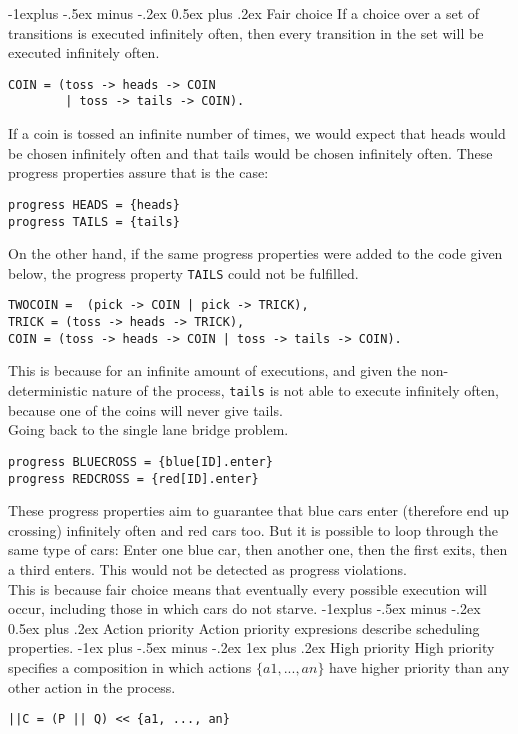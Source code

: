 \documentclass[10pt,landscape]{article}
\makeatletter
\renewcommand{\subsection}{\@startsection{subsection}{2}{0mm}%
                                {-1explus -.5ex minus -.2ex}%
                                {0.5ex plus .2ex}%
                                {\normalfont\normalsize\bfseries}}
\renewcommand{\subsubsection}{\@startsection{subsubsection}{3}{0mm}%
                                {-1ex plus -.5ex minus -.2ex}%
                                {1ex plus .2ex}%
                                {\normalfont\small\bfseries}}
\makeatother
\begin{document}
\begin{multicols}{3}
\subsection{Fair choice}
If a choice over a set of transitions is executed infinitely often, then every transition in the set will be executed infinitely often.
\begin{verbatim}
COIN = (toss -> heads -> COIN
        | toss -> tails -> COIN).
\end{verbatim}
If a coin is tossed an infinite number of times, we would expect that heads would be chosen infinitely often and that tails would be chosen infinitely often. These progress properties assure that is the case:
\begin{verbatim}
progress HEADS = {heads}
progress TAILS = {tails}
\end{verbatim}
On the other hand, if the same progress properties were added to the code given below, the progress property \texttt{TAILS} could not be fulfilled.
\begin{verbatim}
TWOCOIN =  (pick -> COIN | pick -> TRICK),
TRICK = (toss -> heads -> TRICK),
COIN = (toss -> heads -> COIN | toss -> tails -> COIN).
\end{verbatim}
This is because for an infinite amount of executions, and given the non-deterministic nature of the process, \texttt{tails} is not able to execute infinitely often, because one of the coins will never give tails.\\
Going back to the single lane bridge problem.
\begin{verbatim}
progress BLUECROSS = {blue[ID].enter}
progress REDCROSS = {red[ID].enter}
\end{verbatim}
These progress properties aim to guarantee that blue cars enter (therefore end up crossing) infinitely often and red cars too. But it is possible to loop through the same type of cars: Enter one blue car, then another one, then the first exits, then a third enters. This would not be detected as progress violations.\\
This is because fair choice means that eventually every possible execution will occur, including those in which cars do not starve.
\subsection{Action priority}
Action priority expresions describe scheduling properties.
\subsubsection{High priority}
High priority specifies a composition in which actions $\{a1,...,an\}$ have higher priority than any other action in the process.
\begin{verbatim}
||C = (P || Q) << {a1, ..., an}
\end{verbatim}

\end{multicols}
\end{document}
